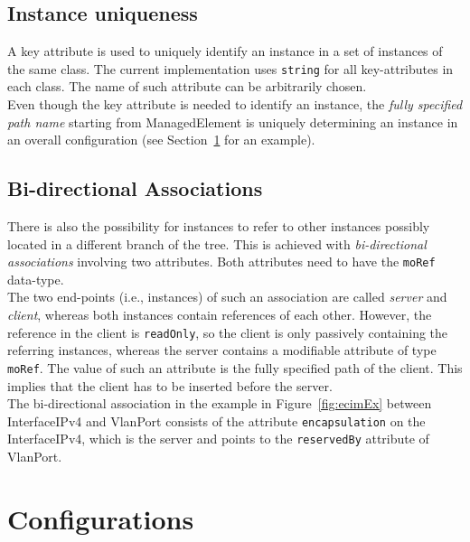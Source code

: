 
\subsection{Instance uniqueness}\label{subsec:unique}

A key attribute is used to uniquely identify an instance in a set of instances of the same class. The current implementation uses \verb|string| for all key-attributes in each class. The name of such attribute can be arbitrarily chosen.\\

Even though the key attribute is needed to identify an instance, the \emph{fully specified path name} starting from \textsf{ManagedElement} is uniquely determining an instance in an overall configuration (see Section~\ref{sec:configuration} for an example).


\subsection{Bi-directional Associations}\label{subsec:bidir}

There is also the possibility for instances to refer to other instances possibly located in a different branch of the tree. This is achieved with \emph{bi-directional associations} involving two attributes. Both attributes need to have the \verb|moRef| data-type. \\

The two end-points (i.e., instances) of such an association are called \emph{server} and \emph{client}, whereas both instances contain references of each other. However, the reference in the client is \verb|readOnly|, so the client is only passively containing the referring instances, whereas the server contains a modifiable attribute of type \verb|moRef|. The value of such an attribute is the fully specified path of the client. This implies that the client has to be inserted before the server.\\

The bi-directional association in the example in Figure~\ref{fig:ecimEx} between \textsf{InterfaceIPv4} and \textsf{VlanPort} consists of the attribute \verb|encapsulation| on the \textsf{InterfaceIPv4}, which is the server and points to the \verb|reservedBy| attribute of \textsf{VlanPort}.


\section{Configurations}\label{sec:configuration}

